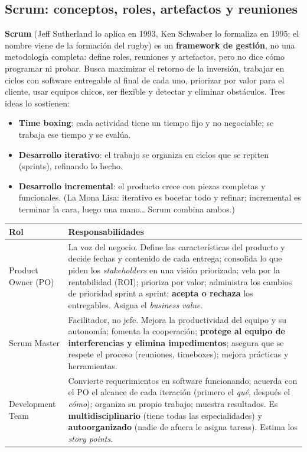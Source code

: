 \documentclass[11pt,a4paper]{article}
\begin{document}
\subsection{Scrum: conceptos, roles, artefactos y reuniones}
\textbf{Scrum} (Jeff Sutherland lo aplica en 1993, Ken Schwaber lo formaliza en 1995; el nombre viene de la
formación del rugby) es un \textbf{framework de gestión}, no una metodología completa: define roles, reuniones y
artefactos, pero no dice cómo programar ni probar. Busca maximizar el retorno de la inversión, trabajar en
ciclos con software entregable al final de cada uno, priorizar por valor para el cliente, usar equipos chicos,
ser flexible y detectar y eliminar obstáculos. Tres ideas lo sostienen:
\begin{itemize}
  \item \textbf{Time boxing}: cada actividad tiene un tiempo fijo y no negociable; se trabaja ese tiempo y se
  evalúa.
  \item \textbf{Desarrollo iterativo}: el trabajo se organiza en ciclos que se repiten (sprints), refinando lo
  hecho.
  \item \textbf{Desarrollo incremental}: el producto crece con piezas completas y funcionales. (La Mona Lisa:
  iterativo es bocetar todo y refinar; incremental es terminar la cara, luego una mano\ldots{} Scrum combina
  ambos.)
\end{itemize}

\begin{center}\small
\begin{tabularx}{\textwidth}{@{}l X@{}}
\toprule
\textbf{Rol} & \textbf{Responsabilidades}\\
\midrule
Product Owner (PO) & La voz del negocio. Define las características del producto y decide fechas y contenido
de cada entrega; consolida lo que piden los \emph{stakeholders} en una visión priorizada; vela por la
rentabilidad (ROI); prioriza por valor; administra los cambios de prioridad sprint a sprint; \textbf{acepta o
rechaza} los entregables. Asigna el \emph{business value}.\\
Scrum Master & Facilitador, no jefe. Mejora la productividad del equipo y su autonomía; fomenta la cooperación;
\textbf{protege al equipo de interferencias y elimina impedimentos}; asegura que se respete el proceso
(reuniones, timeboxes); mejora prácticas y herramientas.\\
Development Team & Convierte requerimientos en software funcionando; acuerda con el PO el alcance de cada
iteración (primero el \emph{qué}, después el \emph{cómo}); organiza su propio trabajo; muestra resultados.
Es \textbf{multidisciplinario} (tiene todas las especialidades) y \textbf{autoorganizado} (nadie de afuera le
asigna tareas). Estima los \emph{story points}.\\
\bottomrule
\end{tabularx}
\end{center}
\end{document}
